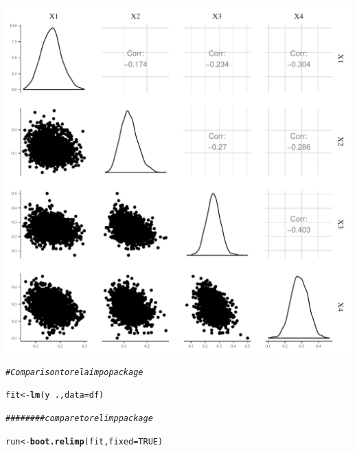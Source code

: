 \documentclass[11pt,a4paper,twoside]{book}\usepackage[]{graphicx}\usepackage[]{color}
\makeatletter
\newcommand{\hlnum}[1]{\textcolor[rgb]{0.686,0.059,0.569}{#1}}%
\newcommand{\hlcom}[1]{\textcolor[rgb]{0.678,0.584,0.686}{\textit{#1}}}%
\newcommand{\hlopt}[1]{\textcolor[rgb]{0,0,0}{#1}}%
\newcommand{\hlstd}[1]{\textcolor[rgb]{0.345,0.345,0.345}{#1}}%
\newcommand{\hlkwb}[1]{\textcolor[rgb]{0.69,0.353,0.396}{#1}}%
\newcommand{\hlkwc}[1]{\textcolor[rgb]{0.333,0.667,0.333}{#1}}%
\newcommand{\hlkwd}[1]{\textcolor[rgb]{0.737,0.353,0.396}{\textbf{#1}}}%
\newenvironment{kframe}{%
 \def\at@end@of@kframe{}%
 \ifinner\ifhmode%
  \def\at@end@of@kframe{\end{minipage}}%
  \begin{minipage}{\columnwidth}%
 \fi\fi%
 \def\FrameCommand##1{\hskip\@totalleftmargin \hskip-\fboxsep
 \colorbox{shadecolor}{##1}\hskip-\fboxsep
     \hskip-\linewidth \hskip-\@totalleftmargin \hskip\columnwidth}%
 \MakeFramed {\advance\hsize-\width
   \@totalleftmargin\z@ \linewidth\hsize
   \@setminipage}}%
 {\par\unskip\endMakeFramed%
 \at@end@of@kframe}
\newenvironment{knitrout}{}{} %
\makeatother
\begin{document}
\begin{knitrout}
{\centering \includegraphics[width=\textwidth-3cm]{figure/ch03_figsimdata_LMG-1} 

}


\begin{kframe}\begin{alltt}
\hlcom{# Comparison to relaimpo package}

\hlstd{fit} \hlkwb{<-} \hlkwd{lm}\hlstd{(y}\hlopt{~}\hlstd{.,} \hlkwc{data}\hlstd{=df)}

\hlcom{######## compare to relimp package}

\hlstd{run}\hlkwb{<-}\hlkwd{boot.relimp}\hlstd{(fit,} \hlkwc{fixed}\hlstd{=}\hlnum{TRUE}\hlstd{)}


\end{alltt}
\end{kframe}
\end{knitrout}
\end{document}
